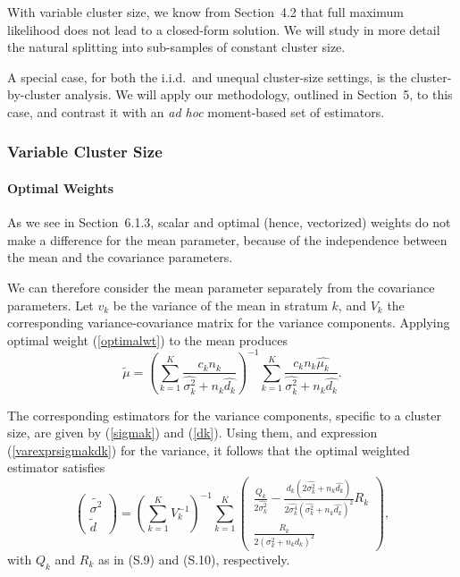 \documentclass[11pt,a5paper,twoside]{book}
\let\oldparagraph\paragraph
\renewcommand{\paragraph}[1]{\oldparagraph{#1}\mbox{}}
\begin{document}
With variable cluster size, we know from 
Section~4.2
that full maximum likelihood does not 
lead to a closed-form solution. We will study in more detail 
the natural splitting into sub-samples of constant cluster size.

A special case, for both the i.i.d.\  and 
unequal cluster-size settings, is the cluster-by-cluster 
analysis. We will apply our methodology, outlined in 
Section~5,
to this case, and contrast it with 
an {\em ad hoc\/} moment-based set of estimators.

\subsubsection{Variable Cluster Size}

\paragraph{Optimal Weights}\label{owcs}

As we see in Section~6.1.3,
scalar and optimal (hence, vectorized) weights do not make a difference for the mean parameter, 
because of the independence between the mean and the covariance parameters.

We can therefore consider the mean parameter separately from the 
covariance parameters. Let $v_k$ be the variance of the mean in 
stratum $k$, and $V_k$ the corresponding variance-covariance matrix 
for the variance components. Applying optimal weight (\ref{optimalwt}) 
to the mean produces
\begin{equation}
\label{meanident1}
\widetilde{\mu}=\left(\sum_{k=1}^K\frac{c_kn_k}{\widehat{\sigma^2_k}+n_k\widehat{d_k}}\right)^{-1}
\sum_{k=1}^K\frac{c_kn_k\widehat{\mu_k}}{\widehat{\sigma^2_k}+n_k\widehat{d_k}}.
\end{equation}


The corresponding estimators for the variance components, 
specific to a cluster size, are given by (\ref{sigmak}) and (\ref{dk}). 
Using them, and expression (\ref{varexprsigmakdk}) for the variance, 
it follows that the optimal weighted estimator satisfies
\begin{equation}
\label{ident1}
\left(
\begin{array}{c}
\widetilde{\sigma^2}\\
\widetilde{d}
\end{array}
\right)
=
\left(\sum_{k=1}^KV_k^{-1}\right)^{-1}
\sum_{k=1}^K
\left(
\begin{array}{c}
\frac{Q_k}{2\widehat{\sigma^2_k}}-\frac{d_k(2\widehat{\sigma^2_k}+n_k\widehat{d_k})}
{2\widehat{\sigma^4_k}(\widehat{\sigma^2_k}+n_k\widehat{d_k})^2}R_k\\
\frac{R_k}{2(\sigma_k^2+n_kd_k)^2}
\end{array}
\right)
,
\end{equation}
with $Q_k$ and $R_k$ as in (S.9) and (S.10),
respectively.
\end{document}

